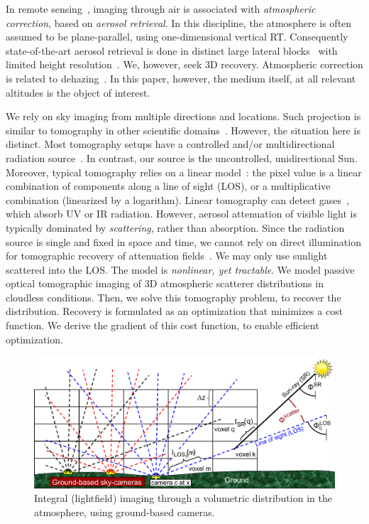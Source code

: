 \documentclass[10pt,letterpaper]{article}
\newcommand{\yoavcomment}[1]{}
\renewcommand{\yoavcomment}[1]{#1} %
\begin{document}
In remote sensing~\cite{Mishchenko2007}, imaging through air is
associated with {\em atmospheric correction}, based on {\em aerosol
  retrieval}. In this discipline, the atmosphere is often assumed to
be plane-parallel, using one-dimensional vertical RT. Consequently
state-of-the-art aerosol retrieval is done in distinct large lateral
blocks~\cite{Martonchikc} with limited height
resolution~\cite{kalashnikova}. We, however, seek 3D
recovery. Atmospheric correction is related to
dehazing~\cite{Namer2009}. In this paper, however, the medium itself,
at all relevant altitudes is the object of interest.


We rely on sky imaging from multiple directions and locations. Such
projection is similar to tomography in other scientific
domains~\cite{Bluestone2001}. However, the situation here is
distinct. Most tomography setups have a controlled and/or
multidirectional radiation source~\cite{Boas2001,messer}. In
contrast, our source is the uncontrolled, unidirectional
Sun. Moreover, typical tomography relies on a linear
model~\cite{gregson}: the pixel value is a linear combination of
components along a line of sight (LOS), or a multiplicative
combination (linearized by a logarithm). Linear tomography can detect
gases~\cite{Cosofret2009}, which absorb UV or IR radiation. However,
aerosol attenuation of visible light is typically dominated by {\em
  scattering}, rather than absorption. Since the radiation source is
single and fixed in space and time, we cannot rely on direct
illumination for tomographic recovery of attenuation
fields~\cite{Aviles2011}. We may only use sunlight scattered into the
LOS. The model is {\em nonlinear, yet tractable}. We model passive
optical tomographic imaging of 3D atmospheric scatterer distributions
in cloudless conditions. Then, we solve this tomography problem, to
recover the distribution. Recovery is formulated as an optimization
that minimizes a cost function. We derive the gradient of this cost
function, to enable efficient optimization.
\begin{figure}[t!]
  \begin{center}
    \yoavcomment{\includegraphics[width=\linewidth]{images/groundtomog24.pdf}}
  \end{center}
  \caption{\small Integral (lightfield) imaging through a volumetric distribution
    in the atmosphere, using ground-based cameras.}
  \label{fig:groundgrid}
\end{figure}
\end{document}
